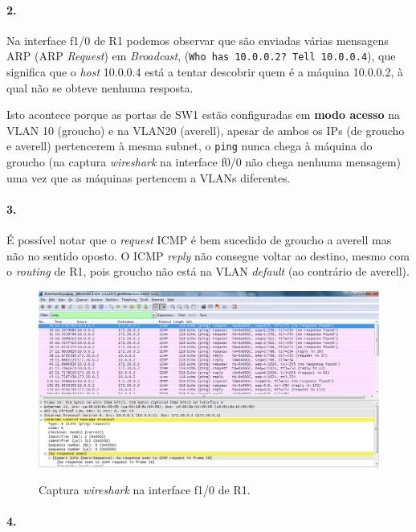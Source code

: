 \paragraph{2.}
Na interface \textsf{f1/0} de \textsf{R1} podemos observar que são enviadas várias
mensagens ARP (ARP \emph{Request}) em \emph{Broadcast}, 
(\texttt{Who has 10.0.0.2? Tell 10.0.0.4}), que significa que o \emph{host} 
10.0.0.4 está a tentar descobrir quem é a máquina 10.0.0.2, à qual não se obteve
nenhuma resposta.

Isto acontece porque as portas de \textsf{SW1} estão configuradas em 
\textbf{modo acesso} na VLAN 10 (\textsf{groucho}) e na VLAN20  (\textsf{averell}), 
apesar de ambos os IPs (de \textsf{groucho} e \textsf{averell}) pertencerem à mesma subnet, o \texttt{ping} nunca chega à máquina do \textsf{groucho} (na captura 
\emph{wireshark} na interface \textsf{f0/0} não chega nenhuma mensagem) uma vez que 
as máquinas pertencem a VLANs diferentes.


\paragraph{3.}
É possível notar que o \emph{request} ICMP é bem sucedido de \textsf{groucho} a \textsf{averell} mas não no sentido oposto. O ICMP \emph{reply} não consegue voltar ao destino, mesmo com o \emph{routing} de \textsf{R1}, pois \textsf{groucho} não está na VLAN \emph{default} (ao contrário de \textsf{averell}).
 
 
\begin{figure}[h]
\centering
\includegraphics[width=1\textwidth, height=0.38\textheight]{3_interface10_R1.png}
\label{fig:4-capturaWireshark}
\caption{Captura \emph{wireshark} na interface \textsf{f1/0} de \textsf{R1}.}
\end{figure}


\paragraph{4.}

